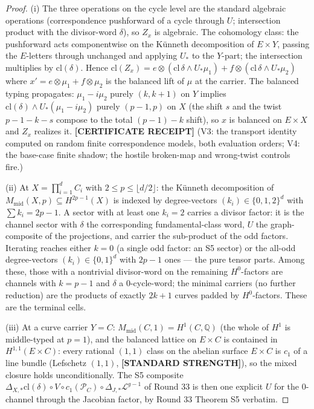 \documentclass[11pt]{article}
\newcommand{\STANDARD}{\textbf{[STANDARD STRENGTH]}}
\newcommand{\CERT}{\textbf{[CERTIFICATE RECEIPT]}}
\newcommand{\Q}{\mathbb{Q}}
\begin{document}
\begin{proof}
(i) The three operations on the cycle level are the standard algebraic
operations (correspondence pushforward of a cycle through $U$; intersection
product with the divisor-word $\delta$), so $Z_x$ is algebraic. The
cohomology class: the pushforward acts componentwise on the K\"unneth
decomposition of $E\times Y$, passing the $E$-letters through unchanged
and applying $U_*$ to the $Y$-part; the intersection multiplies by
$\mathrm{cl}(\delta)$. Hence
$\mathrm{cl}(Z_x)=e\otimes(\mathrm{cl}\,\delta\wedge U_*\mu_1)
+f\otimes(\mathrm{cl}\,\delta\wedge U_*\mu_2)$ where
$x'=e\otimes\mu_1+f\otimes\mu_2$ is the balanced lift of $\mu$ at the
carrier. The balanced typing propagates: $\mu_1-i\mu_2$ purely
$(k,k+1)$ on $Y$ implies
$\mathrm{cl}(\delta)\wedge U_*(\mu_1-i\mu_2)$ purely $(p-1,p)$ on $X$
(the shift $s$ and the twist $p-1-k-s$ compose to the total
$(p-1)-k$ shift), so $x$ is balanced on $E\times X$ and
$Z_x$ realizes it. \CERT{} (V3: the transport identity computed on random
finite correspondence models, both evaluation orders; V4: the base-case
finite shadow; the hostile broken-map and wrong-twist controls fire.)

(ii) At $X=\prod_{i=1}^{d}C_i$ with $2\le p\le\lfloor d/2\rfloor$: the
K\"unneth decomposition of $M_{\mathrm{mid}}(X,p)\subseteq H^{2p-1}(X)$
is indexed by degree-vectors $(k_i)\in\{0,1,2\}^{d}$ with
$\sum k_i=2p-1$. A sector with at least one $k_i=2$ carries a divisor
factor: it is the channel sector with $\delta$ the corresponding
fundamental-class word, $U$ the graph-composite of the projections, and
carrier the sub-product of the odd factors. Iterating reaches either
$k=0$ (a single odd factor: an S5 sector) or the all-odd degree-vectors
$(k_i)\in\{0,1\}^{d}$ with $2p-1$ ones --- the pure tensor parts. Among
these, those with a nontrivial divisor-word on the remaining
$H^0$-factors are channels with $k=p-1$ and $\delta$ a $0$-cycle-word;
the minimal carriers (no further reduction) are the products of exactly
$2k+1$ curves padded by $H^0$-factors. These are the terminal cells.

(iii) At a curve carrier $Y=C$: $M_{\mathrm{mid}}(C,1)=H^{1}(C,\Q)$
(the whole of $H^1$ is middle-typed at $p=1$), and the balanced lattice
on $E\times C$ is contained in $H^{1,1}(E\times C)$: every rational
$(1,1)$ class on the abelian surface $E\times C$ is $c_1$ of a line
bundle (Lefschetz $(1,1)$, \STANDARD{}), so the mixed closure holds
unconditionally. The S5 composite
$\Delta_{X,*}\mathrm{cl}(\delta)\circ V\circ c_1(\mathcal P_C)\circ
\Delta_{J,*}\mathcal L^{g-1}$ of Round 33 is then one explicit $U$ for
the $0$-channel through the Jacobian factor, by Round 33 Theorem S5
verbatim.
\end{proof}
\end{document}
